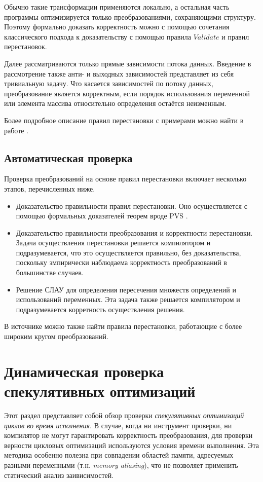 Обычно такие трансформации применяются локально, а остальная часть программы оптимизируется только преобразованиями, сохраняющими структуру. Поэтому формально доказать корректность можно с помощью сочетания классического подхода к доказательству с помощью правила $Validate$ и правил перестановок.

Далее рассматриваются только прямые зависимости потока данных. Введение в рассмотрение также анти- и выходных зависимостей представляет из себя тривиальную задачу. Что касается зависимостей по потоку данных, преобразование является корректным, если порядок использования переменной или элемента массива относительно определения остаётся неизменным.

Более подробное описание правил перестановки с примерами можно найти в работе \cite{ZuckPFGH02}.

\subsection{Автоматическая проверка}

Проверка преобразований на основе правил перестановки включает несколько этапов, перечисленных ниже.

\begin{itemize}
	\item Доказательство правильности правил перестановки. Оно осуществляется с помощью формальных доказателей теорем вроде PVS \cite{SOR93}.
	\item Доказательство правильности преобразования и корректности перестановки. Задача осуществления перестановки решается компилятором и подразумевается, что это осуществляется правильно, без доказательства, поскольку эмпирически наблюдаема корректность преобразований в большинстве случаев.
	\item Решение СЛАУ для определения пересечения множеств определений и использований переменных. Эта задача также решается компилятором и подразумевается корретность осуществления решения.
\end{itemize}

В источнике \cite{ZPL00} можно также найти правила перестановки, работающие с более широким кругом преобразований.

\section{Динамическая проверка спекулятивных оптимизаций}

Этот раздел представляет собой обзор проверки \emph{спекулятивных оптимизаций циклов во время исполнения}. В случае, когда ни инструмент проверки, ни компилятор не могут гарантировать корректность преобразования, для проверки верности цикловых оптимизаций используются условия времени выполнения. Эта методика особенно полезна при совпадении областей памяти, адресуемых разными переменными (т.н. \emph{memory aliasing}), что не позволяет применить статический анализ заивисимостей.

